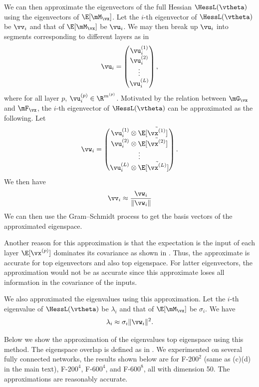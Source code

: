 We can then approximate the eigenvectors of the full Hessian $\HessL(\vtheta)$ using the eigenvectors of $\E[\mM_\vx]$. Let the $i$-th eigenvector of $\HessL(\vtheta)$ be $\vv_i$ and that of $\E[\mM_\vx]$ be $\vu_i$. We may then break up $\vu_i$ into segments corresponding to different layers as in
\begin{equation}
    \vu_i = \begin{pmatrix}
    \vu_i^{(1)}\\
    \vu_i^{(2)}\\
    \vdots\\
    \vu_i^{(L)}
    \end{pmatrix},
\end{equation}
where for all layer $p$, $\vu_i^{(p)}\in\R^{m^{(p)}}$.
Motivated by the relation between $\mG_\vx$ and $\mF_\vx$, the $i$-th eigenvector of $\HessL(\vtheta)$ can be approximated as the following. Let
\begin{equation}
    \vw_i = \begin{pmatrix}
    \vu_i^{(1)} \otimes \E[\tilde{\vx^{(1)}}]\\
    \vu_i^{(2)}\otimes \E[\tilde{\vx^{(2)}}]\\
    \vdots\\
    \vu_i^{(L)}\otimes \E[\tilde{\vx^{(L)}}]
    \end{pmatrix}.
\end{equation}
We then have
\begin{equation}
    \vv_i \approx \frac{\vw_i}{\|\vw_i\|}
\end{equation}
We can then use the Gram–Schmidt process to get the basis vectors of the approximated eigenspace.

Another reason for this approximation is that the expectation is the input of each layer $\E[\vx^{(p)}]$ dominates its covariance as shown in . Thus, the approximate is accurate for top eigenvectors and also top eigenspace. For latter eigenvectors, the approximation would not be as accurate since this approximate loses all information in the covariance of the inputs.

We also approximated the eigenvalues using this approximation. Let the $i$-th eigenvalue of $\HessL(\vtheta)$ be $\lambda_i$ and that of $\E[\mM_\vx]$ be $\sigma_i$. We have
\begin{equation}
    \lambda_i \approx \sigma_i\|\vw_i\|^2.
\end{equation}

Below we show the approximation of the eigenvalues top eigenspace using this method. The eigenspace overlap is defined as in . We experimented on several fully connected networks, the results shown below are for F-$200^2$ (same as  (c)(d) in the main text), F-$200^4$, F-$600^4$, and F-$600^8$, all with dimension 50. The approximations are reasonably accurate.

